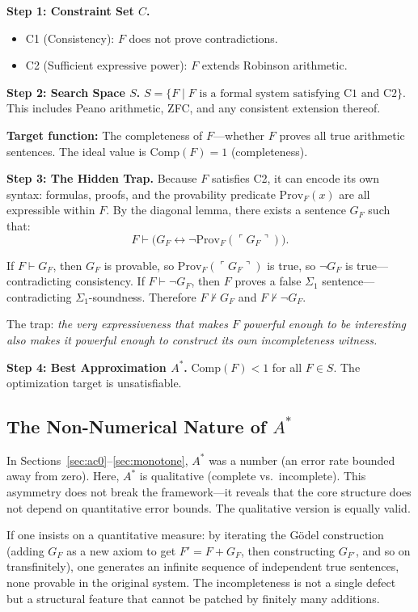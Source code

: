 \documentclass[11pt,a4paper]{article}
\theoremstyle{plain}
\theoremstyle{definition}
\theoremstyle{remark}
\newcommand{\Comp}{\mathrm{Comp}}
\newcommand{\Prov}{\mathrm{Prov}}
\begin{document}
\textbf{Step 1: Constraint Set $C$.}
\begin{itemize}
\item C1 (Consistency): $F$ does not prove contradictions.
\item C2 (Sufficient expressive power): $F$ extends Robinson arithmetic.
\end{itemize}

\textbf{Step 2: Search Space $S$.} $S = \{ F \mid F \text{ is a formal system satisfying C1 and C2} \}$. This includes Peano arithmetic, ZFC, and any consistent extension thereof.

\textbf{Target function:} The completeness of $F$---whether $F$ proves all true arithmetic sentences. The ideal value is $\Comp(F) = 1$ (completeness).

\textbf{Step 3: The Hidden Trap.} Because $F$ satisfies C2, it can encode its own syntax: formulas, proofs, and the provability predicate $\Prov_F(x)$ are all expressible within $F$. By the diagonal lemma, there exists a sentence $G_F$ such that:
$$F \vdash \bigl(G_F \leftrightarrow \neg\Prov_F(\ulcorner G_F \urcorner)\bigr).$$

If $F \vdash G_F$, then $G_F$ is provable, so $\Prov_F(\ulcorner G_F \urcorner)$ is true, so $\neg G_F$ is true---contradicting consistency. If $F \vdash \neg G_F$, then $F$ proves a false $\Sigma_1$ sentence---contradicting $\Sigma_1$-soundness. Therefore $F \nvdash G_F$ and $F \nvdash \neg G_F$.

The trap: \emph{the very expressiveness that makes $F$ powerful enough to be interesting also makes it powerful enough to construct its own incompleteness witness.}

\textbf{Step 4: Best Approximation $A^*$.} $\Comp(F) < 1$ for all $F \in S$. The optimization target is unsatisfiable.

\subsection{The Non-Numerical Nature of $A^*$}

In Sections~\ref{sec:ac0}--\ref{sec:monotone}, $A^*$ was a number (an error rate bounded away from zero). Here, $A^*$ is qualitative (complete vs.\ incomplete). This asymmetry does not break the framework---it reveals that the core structure does not depend on quantitative error bounds. The qualitative version is equally valid.

If one insists on a quantitative measure: by iterating the G\"{o}del construction (adding $G_F$ as a new axiom to get $F' = F + G_F$, then constructing $G_{F'}$, and so on transfinitely), one generates an infinite sequence of independent true sentences, none provable in the original system. The incompleteness is not a single defect but a structural feature that cannot be patched by finitely many additions.
\end{document}
